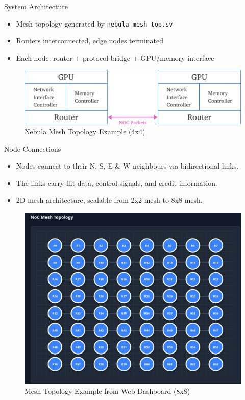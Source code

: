 \documentclass{beamer}
\begin{document}
\begin{frame}{System Architecture}
  \begin{itemize}
    \item Mesh topology generated by \texttt{nebula\_mesh\_top.sv}
    \item Routers interconnected, edge nodes terminated
    \item Each node: router + protocol bridge + GPU/memory interface
  \end{itemize}
  \hspace{5pt}
  \begin{figure}
	\centering
	\includegraphics[width=0.6\linewidth]{images/inter-router-comms.png}
	\caption{Nebula Mesh Topology Example (4x4)}
  \end{figure}
\end{frame}


\begin{frame}{Node Connections}
	\begin{itemize}
		\item Nodes connect to their N, S, E \& W neighbours via bidirectional links.
		\item The links carry flit data, control signals, and credit information.
		\item 2D mesh architecture, scalable from 2x2 mesh to 8x8 mesh.
	\end{itemize}
	\hspace{5pt}
	\begin{figure}
		\centering
		\includegraphics[width=0.4\linewidth]{images/router-mesh.png}
		\caption{Mesh Topology Example from Web Dashboard (8x8)}
	\end{figure}
\end{frame}
\end{document}

